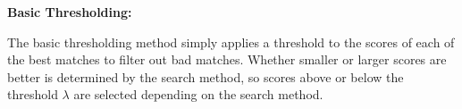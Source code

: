 \parbox{\textwidth}{\textbf{Basic Thresholding:}} \smallskip
\parbox{\textwidth}{The basic thresholding method simply applies a threshold to the scores of each of the best matches to filter out bad matches. Whether smaller or larger scores are better is determined by the search method, so scores above or below the threshold $\lambda$ are selected depending on the search method.}
\smallskip
